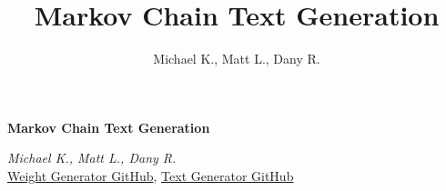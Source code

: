 \documentclass[12pt]{article}
\title{ Markov Chain Text Generation  }
\author{ Michael K., Matt L., Dany R.}
\date{}
\begin{document}
\thispagestyle{firstpage}
\begin{center}
\vspace{1cm}
\Large{\textbf{ Markov Chain Text Generation  }}

\vspace{0.25cm}

\large{\textit{ Michael K., Matt L., Dany R. }}\\
\href{https://github.com/bepissbepisss/Markov-Chain-Weight-Generator/tree/2nd-order}{Weight Generator GitHub}, \href{https://github.com/bepissbepisss/Markov-Chain-Text-Generator}{Text Generator GitHub}

\vspace{0.5cm}
\end{center}







\end{document}
